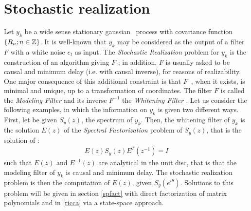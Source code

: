 
%

\label{stochastic realization}
\chapter{Stochastic realization}

Let $y_k$ be a wide sense stationary gaussian~ process with covariance
function $\{R_n;n\in {\Bbb Z} \}$. 
It is well-known that $y_k$ may be considered
as the output of a filter $F$ with a white noise $e_t$ as input. The {\em 
Stochastic Realization \em} problem for $y_k$ is the construction of an 
algorithm giving $F$ ; in addition, $F$ is usually asked to be causal 
and minimum delay (i.e. with causal inverse), 
for reasons of realizability. One major consequence of this additional 
constraint is that $F$~, when it exists, is minimal and unique, 
up to a transformation of coordinates. 
The filter $F$ is called the {\em Modeling 
Filter \em}  and its inverse $F^{-1}$ 
the {\em Whitening Filter \em} . 
Let us consider the following examples, in which the information 
on $y_k$ is given two different ways.
First, let be given $S_y(z)$, the spectrum  of $y_k$. 
Then, the whitening filter of $y_k$ is the solution $E(z)$ 
of the {\em Spectral Factorization \em} 
problem of $S_y(z)$, that is the solution of :
\begin{eqnarray}
E(z)S_y(z)E^{T}(z^{-1})=I
\label{e.ricc.1}
\end{eqnarray}
such that $E(z)$ and $E^{-1}(z)$ are analytical in the  unit disc, 
that is  that the modeling filter of $y_k$ is causal and minimum 
 delay. The stochastic realization problem is then the computation 
of $E(z)$, given $S_y(e^{i\theta})$. Solutions to this
problem will be given in section \ref{spfact} with direct factorization of
matrix polynomials and 
in \ref{ricca} via a state-space approach.

